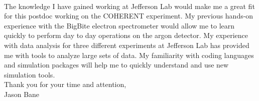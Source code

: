 \documentclass[12pt,letterpaper]{article}
\begin{document}
\paragraph{}The knowledge I have gained working at Jefferson Lab would make me a great fit for this postdoc working on the COHERENT experiment. My previous hands-on experience with the BigBite electron spectrometer would allow me to learn quickly to perform day to day operations on the argon detector. My experience with data analysis for three different experiments at Jefferson Lab has provided me with tools to analyze large sets of data. My familiarity with coding languages and simulation packages will help me to quickly understand and use new simulation tools.\\


\noindent Thank you for your time and attention,\\
\noindent Jason Bane
\end{document}
